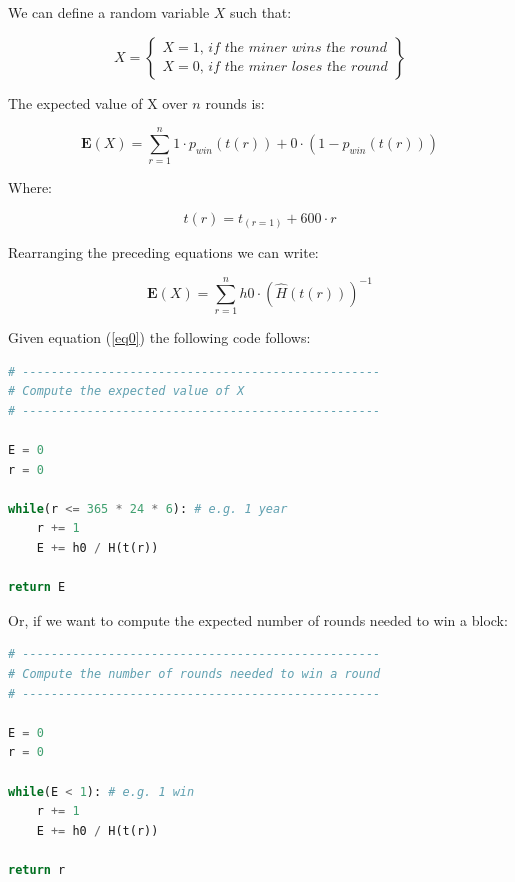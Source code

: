 \documentclass{article}
\begin{document}
We can define a random variable $X$ such that:

\begin{equation}
X = \left\{
        \begin{array}{ll}
            X = 1 \textit{, if the miner wins the round} \\
            X = 0 \textit{, if the miner loses the round}
        \end{array}
    \right \} \label{rndX}
\end{equation}

The expected value of X over $n$ rounds is:

\begin{equation}
    \mathbf{E}(X) = \displaystyle\sum_{r=1}^{n} 1 \cdot p_{win}(t(r)) + 0 \cdot ( 1 - p_{win}(t(r))) \label{eq5}
\end{equation}

Where:

\begin{equation}
    t(r) = t_{(r=1)} + 600 \cdot r \label{eq6}
\end{equation}

Rearranging the preceding equations we can write:

\begin{equation}
    \mathbf{E}(X) = \displaystyle\sum_{r=1}^{n} h0 \cdot (\widehat{H}(t(r)))^{-1} \label{eq0}
\end{equation}

Given equation (\ref{eq0}) the following code follows:

\begin{lstlisting}[language=Python]
# --------------------------------------------------
# Compute the expected value of X
# --------------------------------------------------

E = 0
r = 0

while(r <= 365 * 24 * 6): # e.g. 1 year
    r += 1
    E += h0 / H(t(r))

return E
\end{lstlisting}

Or, if we want to compute the expected number of rounds needed to win a block:

\begin{lstlisting}[language=Python]
# --------------------------------------------------
# Compute the number of rounds needed to win a round
# --------------------------------------------------

E = 0
r = 0

while(E < 1): # e.g. 1 win
    r += 1
    E += h0 / H(t(r))

return r
\end{lstlisting}
\end{document}

